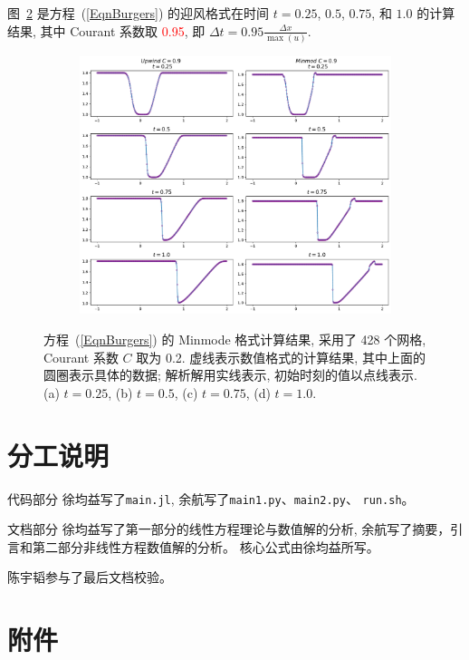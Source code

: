 \documentclass[10.5pt
]{article}
\begin{document}
图~\ref{fig:problem2} 是方程~(\ref{EqnBurgers}) 的迎风格式在时间 $t = 0.25$, $0.5$, $0.75$, 和 $1.0$ 的计算结果, 其中 Courant 系数取 \textcolor{red}{0.95},
即 $\Delta t = 0.95 \frac{\Delta x}{\max(u)}$.

\begin{figure} 
\centering
\begin{subfigure}{.9\linewidth}
  \includegraphics[width=\textwidth]{figures/problem2_myron.pdf} %
	\caption{}
  \label{fig:problem2}
\end{subfigure}
\caption{%
  方程~(\ref{EqnBurgers}) 的 Minmode 格式计算结果, 采用了 428 个网格, Courant 系数 $C$ 取为 0.2. 虚线表示数值格式的计算结果, 其中上面的圆圈表示具体的数据;
  解析解用实线表示, 初始时刻的值以点线表示. (a) $t=0.25$, (b) $t=0.5$, (c) $t=0.75$, (d) $t=1.0$.
}
  \label{fig:problem2}%
\end{figure}

\section{分工说明}

代码部分
徐均益写了\verb|main.jl|, 
余航写了\verb|main1.py|、\verb|main2.py|、 \verb|run.sh|。

文档部分
徐均益写了第一部分的线性方程理论与数值解的分析, 余航写了摘要，引言和第二部分非线性方程数值解的分析。
核心公式由徐均益所写。

陈宇韬参与了最后文档校验。
\section{附件}
\end{document}
